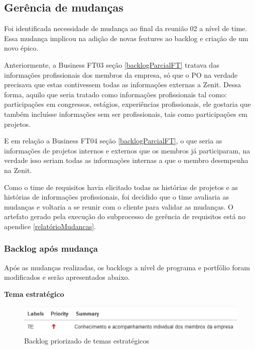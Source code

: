 \subsection{Gerência de mudanças}

 Foi identificada necessidade de mudança ao final da reunião 02 a nível de time. Essa mudança implicou na adição de novas features ao backlog e criação de um novo épico.

 Anteriormente, a Business FT03 seção \ref{backlogParcialFT} tratava das informações profissionais dos membros da empresa, só que o PO na verdade precisava que estas contivessem todas as informações externas a Zenit. Dessa forma, aquilo que seria tratado como informações profissionais tal como: participações em congressos, estágios, experiências profissionais, ele gostaria que também incluísse informações sem ser profissionais, tais como participações em projetos.
 
 E em relação a Business FT04 seção \ref{backlogParcialFT}, o que seria as informações de projetos internos e externos que os membros já participaram, na verdade isso seriam todas as informações internas a que o membro desempenha na Zenit.
 
 Como o time de requisitos havia elicitado todas as histórias de projetos e as histórias de informações profissionais, foi decidido que o time avaliaria as mudanças e voltaria a se reunir com o cliente para validar as mudanças. O artefato gerado pela execução do subprocesso de gerência de requisitos está no apendice \ref{relatórioMudancas}.

\subsubsection{Backlog após mudança}
Após as mudanças realizadas, os backlogs a nível de programa e portfólio foram modificados e serão apresentados abaixo.

\textbf{Tema estratégico}

\begin{figure}[H]
    \centering
    \includegraphics[keepaspectratio=true,scale=0.6]{figuras/blte01.eps}
    \caption[Backlog tema estratégico]{Backlog priorizado de temas estratégicos\label{blte01}}
\end{figure}

